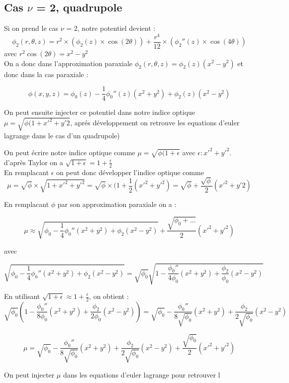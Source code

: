 \documentclass{report}
\begin{document}
\subsection{Cas $\nu$ = 2, quadrupole}
Si on prend le cas $\nu$ = 2, notre potentiel devient : 
\[
\phi_2(r,\theta,z) = r^{2}\times(\phi_2(z)\times \cos(2\theta))
+ \frac{r^{4}}{12} \times (\phi_2''(z)\times \cos(4\theta))
\]
avec $r^2\cos(2\theta)=x^2-y^2$\\

On a donc dans l'approximation paraxiale $\phi_2(r, \theta, z) =\phi_2(z)(x^2 -y^2)$ et donc
dans la cas paraxiale : 

\[
\phi(x,y,z) = \phi_0(z) - \frac{1}{4}\phi_0''(z)(x^2+y^2) + \phi_2(z)(x^2 - y^2)
\]


On peut ensuite injecter ce potentiel dans notre indice optique $\mu = \sqrt{\phi(1+x'^2+ y'2}$, aprés développement on retrouve les equations d'euler lagrange dans le cas d'un quadrupole)

On peut écrire notre indice optique comme $\mu = \sqrt{\phi(1+\epsilon}$ avec $\epsilon : x'^2 +y'^2$. 
d'après Taylor on a $\sqrt{1+\epsilon} = 1 +\frac{\epsilon}{2}$ \\
En remplacant $\epsilon$ on peut donc développer l'indice optique comme 
\[
\mu = \sqrt{\phi}\times \sqrt{1+x'^2+y'^2} = \sqrt{\phi}\times(1+\frac{1}{2}(x'^2
+ y'^2)  = \sqrt{\phi} + \frac{\sqrt{\phi}}{2}(x'^2+y'2)
\]

En remplacant $\phi$ par son approximation paraxiale on a :

\[
\mu \approx \sqrt{\phi_0 - \frac{1}{4}\phi_0''(x^2+y^2) + \phi_2(x^2-y^2)} + \frac{\sqrt{\phi_0 + \dots}}{2}(x'^2+y'^2)
\]

avec 

\[
\sqrt{\phi_0 - \frac{1}{4}\phi_0'' (x^2+y^2) + \phi_2(x^2-y^2)} = \sqrt{\phi_0} \sqrt{1 -\frac{\phi_0''}{4\phi_0}(x^2+y^2) + \frac{\phi_2}{\phi_0}(x^2-y^2)}
\]

En utilisant $\sqrt{1+\epsilon} \approx 1 + \frac{\epsilon}{2}$, on obtient :
 \[
\sqrt{\phi_0} \left( 1 - \frac{\phi_0''}{8\phi_0}(x^2+y^2) + \frac{\phi_2}{2\phi_0}(x^2-y^2) \right) = \sqrt{\phi_0} - \frac{\phi_0''}{8\sqrt{\phi_0}}(x^2+y^2) + \frac{\phi_2}{2\sqrt{\phi_0}}(x^2-y^2)
\]
 

\[
\mu = \sqrt{\phi_0}- \frac{\phi_0''}{8\sqrt{\phi_0}}(x^2+y^2) + \frac{\phi_2}{2\sqrt{\phi_0}}(x^2-y^2) + \frac{\sqrt{\phi_0}}{2}(x'^2+y'^2)
\]


On peut injecter $\mu$ dans les equations d'euler lagrange pour retrouver l
\end{document}
